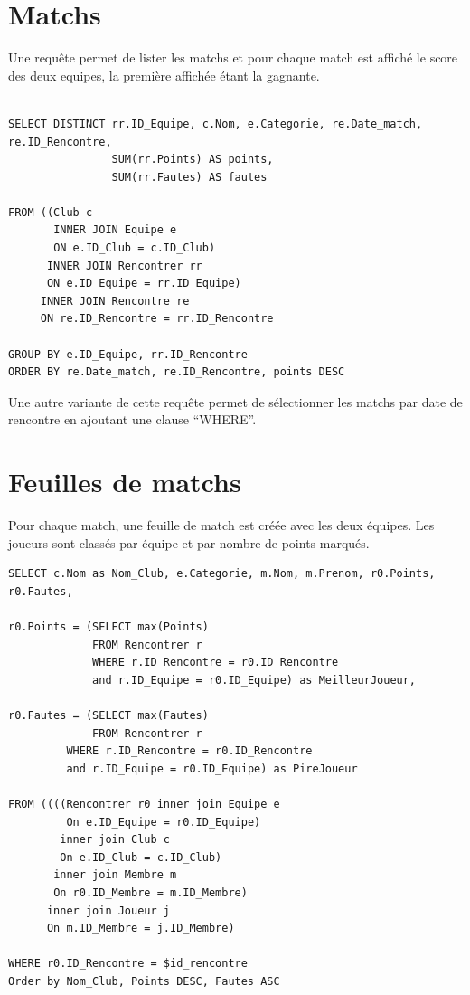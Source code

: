 \documentclass[a4paper»,8pt,french,fleqn]{report}
\begin{document}
\section{Matchs}
Une requête permet de lister les matchs et pour chaque match est affiché le score des deux equipes, la première affichée étant la gagnante.

\begin{lstlisting}

SELECT DISTINCT rr.ID_Equipe, c.Nom, e.Categorie, re.Date_match, re.ID_Rencontre,
                SUM(rr.Points) AS points, 
                SUM(rr.Fautes) AS fautes 
		                      
FROM ((Club c
       INNER JOIN Equipe e
       ON e.ID_Club = c.ID_Club) 
      INNER JOIN Rencontrer rr
      ON e.ID_Equipe = rr.ID_Equipe)
     INNER JOIN Rencontre re
     ON re.ID_Rencontre = rr.ID_Rencontre

GROUP BY e.ID_Equipe, rr.ID_Rencontre
ORDER BY re.Date_match, re.ID_Rencontre, points DESC

\end{lstlisting}

Une autre variante de cette requête permet de sélectionner les matchs par date de rencontre en ajoutant une clause ``WHERE''.


\section{Feuilles de matchs}

Pour chaque match, une feuille de match est créée avec les deux équipes. Les joueurs sont classés par équipe et par nombre de points marqués.

\begin{lstlisting}
SELECT c.Nom as Nom_Club, e.Categorie, m.Nom, m.Prenom, r0.Points, r0.Fautes, 

r0.Points = (SELECT max(Points) 
             FROM Rencontrer r
             WHERE r.ID_Rencontre = r0.ID_Rencontre
             and r.ID_Equipe = r0.ID_Equipe) as MeilleurJoueur,

r0.Fautes = (SELECT max(Fautes) 
             FROM Rencontrer r
	     WHERE r.ID_Rencontre = r0.ID_Rencontre
	     and r.ID_Equipe = r0.ID_Equipe) as PireJoueur 
								
FROM ((((Rencontrer r0 inner join Equipe e
         On e.ID_Equipe = r0.ID_Equipe) 
        inner join Club c            
        On e.ID_Club = c.ID_Club) 
       inner join Membre m
       On r0.ID_Membre = m.ID_Membre) 
      inner join Joueur j
      On m.ID_Membre = j.ID_Membre)

WHERE r0.ID_Rencontre = $id_rencontre
Order by Nom_Club, Points DESC, Fautes ASC
\end{lstlisting}
\end{document}
